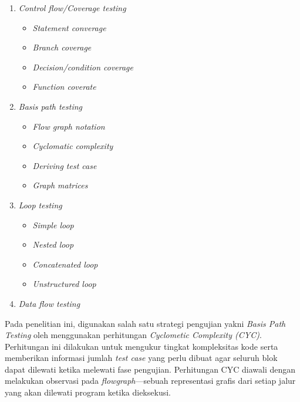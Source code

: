 \begin{enumerate}
    \item \textit{Control flow/Coverage testing}
    \begin{itemize}
        \item \textit{Statement converage}
        \item \textit{Branch coverage}
        \item \textit{Decision/condition coverage}
        \item \textit{Function coverate}
    \end{itemize}

    \item \textit{Basis path testing}
    \begin{itemize}
        \item \textit{Flow graph notation}
        \item \textit{Cyclomatic complexity}
        \item \textit{Deriving test case}
        \item \textit{Graph matrices}
    \end{itemize}

    \item \textit{Loop testing}
    \begin{itemize}
        \item \textit{Simple loop}
        \item \textit{Nested loop}
        \item \textit{Concatenated loop}
        \item \textit{Unstructured loop}
    \end{itemize}

    \item \textit{Data flow testing}
\end{enumerate}



Pada penelitian ini, digunakan salah satu strategi pengujian yakni \textit{Basis Path Testing} oleh \textcite{book:watson} menggunakan perhitungan \textit{Cyclometic Complexity (CYC)}. Perhitungan ini dilakukan untuk mengukur tingkat kompleksitas kode serta memberikan informasi jumlah \textit{test case} yang perlu dibuat agar seluruh blok dapat dilewati ketika melewati fase pengujian. Perhitungan CYC diawali dengan melakukan observasi pada \textit{flowgraph}—sebuah representasi grafis dari setiap jalur yang akan dilewati program ketika dieksekusi.

